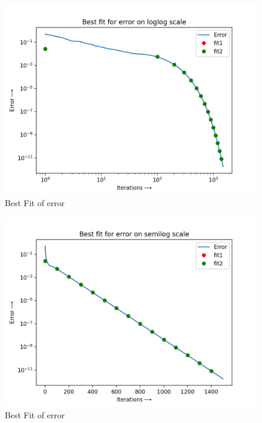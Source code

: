\documentclass[11pt, a4paper]{article}
\begin{document}
\begin{figure}[h!]
\centering
\includegraphics[scale=0.6]{Fig-2.png}
\caption{Best Fit of error}
\label{fig:Best Fit of error}
\end{figure}
\begin{figure}[h!]
\centering
\includegraphics[scale=0.6]{Fig-3.png}
\caption{Best Fit of error}
\label{fig:Best Fit of error}
\end{figure}
\end{document}
